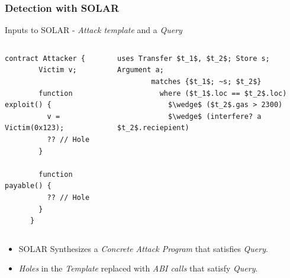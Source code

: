\documentclass{beamer}
\begin{document}
\begin{frame}[fragile]
  \frametitle{Detection with SOLAR}
  Inputs to SOLAR - \textit{Attack template} and a \textit{Query}

  \begin{columns}[T]
    \begin{column}{0.4\textwidth}
      \begin{lstlisting}[language=Solidity, style=transitions, numbers=none]
      contract Attacker {
        Victim v;

        function exploit() {
          v = Victim(0x123);
          ?? // Hole
        }

        function payable() {
          ?? // Hole
        }
      }
      \end{lstlisting}
    \end{column}
      \pause
    \begin{column}{0.6\textwidth}
      \begin{lstlisting}[language=Solar, numbers=none]
        uses Transfer $t_1$, $t_2$; Store s; Argument a;
        matches {$t_1$; ~s; $t_2$}
          where ($t_1$.loc == $t_2$.loc)
            $\wedge$ ($t_2$.gas > 2300)
            $\wedge$ (interfere? a $t_2$.reciepient)
      \end{lstlisting}
    \end{column}
  \end{columns}
  \pause
  \begin{itemize}
    \item \scriptsize{SOLAR Synthesizes a \textit{Concrete Attack Program} that
      satisfies \textit{Query}}.
    \item \scriptsize{\textit{Holes} in the \textit{Template} replaced with
      \textit{ABI calls} that satisfy \textit{Query}.}
\end{itemize}
\end{frame}
\end{document}
